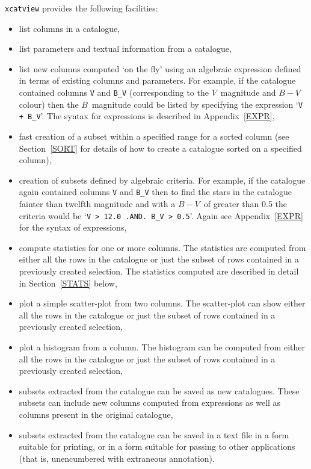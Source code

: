 \documentclass[twoside,11pt]{starlink}
\begin{document}
\texttt{xcatview} provides the following facilities:

\begin{itemize}

  \item list columns in a catalogue,

  \item list parameters and textual information from a catalogue,

  \item list new columns computed `on the fly' using an algebraic
   expression defined in terms of existing columns and parameters. For
   example, if the catalogue contained columns \texttt{V} and \texttt{B\_V}
   (corresponding to the $V$\, magnitude and $B-V$\, colour) then the
   $B$\, magnitude  could be listed by specifying the expression `\texttt{V + B\_V}'. The syntax for expressions is described in
   Appendix~\ref{EXPR},

  \item fast creation of a subset within a specified range for a sorted
   column (see Section~\ref{SORT} for details of how to create a
   catalogue sorted on a specified column),

  \item creation of subsets defined by algebraic criteria. For example,
   if the catalogue again contained columns \texttt{V} and \texttt{B\_V} then
   to find the stars in the catalogue fainter than twelfth magnitude
   and with a $B-V$\, of greater than 0.5 the criteria would be `\texttt{V > 12.0 .AND. B\_V > 0.5}'. Again see Appendix~\ref{EXPR} for the
   syntax of expressions,

  \item compute statistics for one or more columns.  The statistics
   are computed from either all the rows in the catalogue or just the
   subset of rows contained in a previously created selection.  The
   statistics computed are described in detail in Section~\ref{STATS}
   below,

  \item plot a simple scatter-plot from two columns.  The scatter-plot
   can show either all the rows in the catalogue or just the subset of
   rows contained in a previously created selection,

  \item plot a histogram from a column.  The histogram can be computed
   from either all the rows in the catalogue or just the subset of rows
   contained in a previously created selection,

  \item subsets extracted from the catalogue can be saved as new
   catalogues. These subsets can include new columns computed from
   expressions as well as columns present in the original catalogue,

  \item subsets extracted from the catalogue can be saved in a text file
   in a form suitable for printing, or in a form suitable for passing
   to other applications (that is, unencumbered with extraneous
   annotation).

\end{itemize}
\end{document}
